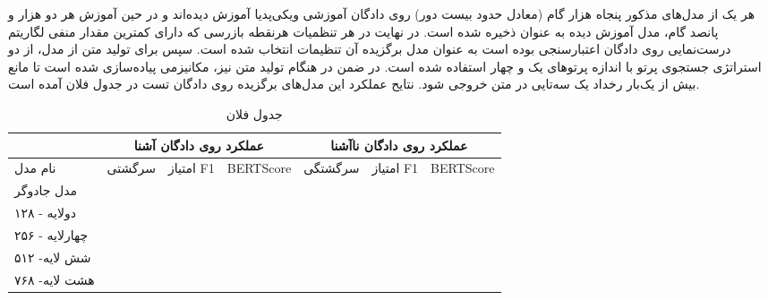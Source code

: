 هر یک از مدل‌های مذکور پنجاه هزار گام (معادل حدود بیست دور) روی دادگان آموزشی ویکی‌پدیا آموزش دیده‌اند و در حین آموزش هر دو هزار و پانصد گام، مدل آموزش دیده به عنوان 
ذخیره شده است. در نهایت  در هر تنظمیات  هرنقطه‌ بازرسی که دارای کمترین مقدار منفی لگاریتم درست‌نمایی روی دادگان اعتبارسنجی بوده است به عنوان مدل برگزیده آن تنظیمات انتخاب شده است. سپس برای تولید متن از مدل، از دو استراتژی جستجوی پرتو با اندازه پرتو‌های یک و چهار استفاده شده است.  در ضمن در هنگام تولید متن نیز، مکانیزمی پیاده‌سازی شده است تا مانع بیش از یک‌بار رخداد یک سه‌تایی در متن خروجی شود. 
نتایح عملکرد این مدل‌های برگزیده روی دادگان تست در جدول فلان آمده است.
\begin{table}[h]
	\caption{جدول فلان}
	\label{table:generation:bert2bert:beam1}
	\begin{tabular}{|l|l|l|l|l|l|l|}
		\hline
		& \multicolumn{3}{c|}{عملکرد روی دادگان آشنا} & \multicolumn{3}{c|}{عملکرد روی دادگان نا‌آشنا} \\ \hline
		نام مدل        & سرگشتی      & امتیاز F1     & BERTScore     & سرگشتگی      & امتیاز F1      & BERTScore      \\ \hline
		مدل جادوگر     &             &               &               &              &                &                \\ \hline
		دولایه - ۱۲۸   &             &               &               &              &                &                \\ \hline
		چهارلایه - ۲۵۶ &             &               &               &              &                &                \\ \hline
		شش لایه- ۵۱۲   &             &               &               &              &                &                \\ \hline
		هشت لایه- ۷۶۸  &             &               &               &              &                &                \\ \hline
	\end{tabular}
\end{table}


